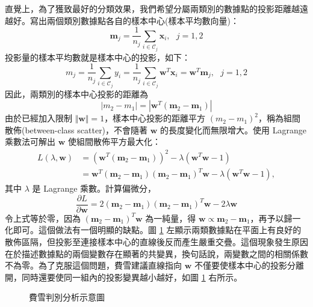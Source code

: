 直覺上，為了獲致最好的分類效果，我們希望分屬兩類別的數據點的投影距離越遠越好。寫出兩個類別數據點各自的樣本中心(樣本平均數向量)：
$$\displaystyle  \mathbf{m}_j=\frac{1}{n_j}\sum_{i\in\mathcal{C}_j}\mathbf{x}_i,~~~j=1,2$$
投影量的樣本平均數就是樣本中心的投影，如下：
$$\displaystyle  m_j=\frac{1}{n_j}\sum_{i\in\mathcal{C}_j}y_i=\frac{1}{n_j}\sum_{i\in\mathcal{C}_j}\mathbf{w}^T\mathbf{x}_i=\mathbf{w}^T\mathbf{m}_j,~~~j=1,2$$
因此，兩類別的樣本中心投影的距離為
$$\displaystyle  \vert m_2-m_1\vert=\left|\mathbf{w}^T(\mathbf{m}_2-\mathbf{m}_1)\right|$$
由於已經加入限制 $\Vert\mathbf{w}\Vert=1$，樣本中心投影的距離平方 $(m_2-m_1)^2$，稱為組間散佈(between-class scatter)，不會隨著 $\mathbf{w}$ 的長度變化而無限增大。使用 Lagrange 乘數法可解出 $\mathbf{w}$ 使組間散佈平方最大化：
$$\displaystyle\begin{aligned}  L(\lambda,\mathbf{w})&=\left(\mathbf{w}^T(\mathbf{m}_2-\mathbf{m}_1)\right)^2-\lambda(\mathbf{w}^T\mathbf{w}-1)\\  &=\mathbf{w}^T(\mathbf{m}_2-\mathbf{m}_1)(\mathbf{m}_2-\mathbf{m}_1)^T\mathbf{w}-\lambda(\mathbf{w}^T\mathbf{w}-1),  \end{aligned}$$
其中 $\lambda$ 是 Lagrange 乘數。計算偏微分，
$$\displaystyle  \frac{\partial L}{\partial\mathbf{w}}=2(\mathbf{m}_2-\mathbf{m}_1)(\mathbf{m}_2-\mathbf{m}_1)^T\mathbf{w}-2\lambda\mathbf{w}$$
令上式等於零，因為 $(\mathbf{m}_2-\mathbf{m}_1)^T\mathbf{w}$ 為一純量，得 $\mathbf{w}\propto\mathbf{m}_2-\mathbf{m}_1$，再予以歸一化即可。這個做法有一個明顯的缺點。圖 \ref{fig:fisher-discriminant} 左顯示兩類數據點在平面上有良好的散佈區隔，但投影至連接樣本中心的直線後反而產生嚴重交疊。這個現象發生原因在於描述數據點的兩個變數存在顯著的共變異，換句話說，兩變數之間的相關係數不為零。為了克服這個問題，費雪建議直線指向 $\mathbf{w}$ 不僅要使樣本中心的投影分離開，同時還要使同一組內的投影變異越小越好，如圖 \ref{fig:fisher-discriminant} 右所示。
\begin{figure}[h]
    \caption{費雪判別分析示意圖}
    \label{fig:fisher-discriminant}
\end{figure}

